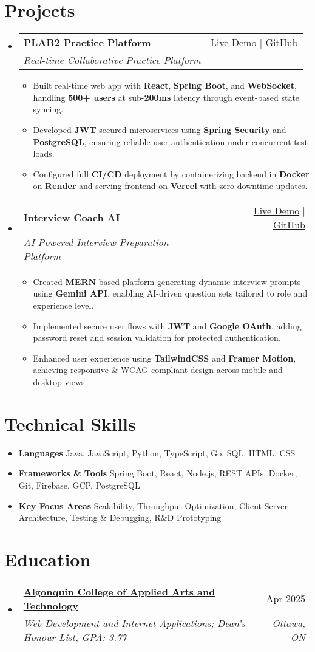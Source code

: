 \documentclass[letterpaper,11pt]{article}
\makeatletter
\newcommand{\resumeItem}[1]{\item\small{#1 \vspace{-2pt}}}
\newcommand{\resumeSubheading}[4]{
  \vspace{-1pt}\item
    \begin{tabular*}{0.97\textwidth}[t]{l@{\extracolsep{\fill}}r}
      \textbf{#1} & #2 \\
      \textit{\small#3} & \textit{\small #4} \\
    \end{tabular*}\vspace{-5pt}
}
\newcommand{\resumeSubHeadingListStart}{\begin{itemize}[leftmargin=*]}
\newcommand{\resumeSubHeadingListEnd}{\end{itemize}}
\newcommand{\resumeItemListStart}{\begin{itemize}}
\newcommand{\resumeItemListEnd}{\end{itemize}\vspace{-5pt}}
\makeatother
\begin{document}
\section{Projects}
  \resumeSubHeadingListStart
    \resumeSubheading
      {\textbf{PLAB2 Practice Platform}}{\href{https://plab2practice.com}{Live Demo} | \href{https://github.com/altansaid/plab2projectnew}{GitHub}}
      {Real-time Collaborative Practice Platform}{}
      \resumeItemListStart
        \resumeItem{Built real-time web app with \textbf{React}, \textbf{Spring Boot}, and \textbf{WebSocket}, handling \textbf{500+ users} at sub-\textbf{200ms} latency through event-based state syncing.}
        \resumeItem{Developed \textbf{JWT}-secured microservices using \textbf{Spring Security} and \textbf{PostgreSQL}, ensuring reliable user authentication under concurrent test loads.}
        \resumeItem{Configured full \textbf{CI/CD} deployment by containerizing backend in \textbf{Docker} on \textbf{Render} and serving frontend on \textbf{Vercel} with zero-downtime updates.}
      \resumeItemListEnd

    \resumeSubheading
      {\textbf{Interview Coach AI}}{\href{https://interviewcoach-ai.vercel.app/}{Live Demo} | \href{https://github.com/altansaid/interviewcoach-ai}{GitHub}}
      {AI-Powered Interview Preparation Platform}{}
      \resumeItemListStart
        \resumeItem{Created \textbf{MERN}-based platform generating dynamic interview prompts using \textbf{Gemini API}, enabling AI-driven question sets tailored to role and experience level.}
        \resumeItem{Implemented secure user flows with \textbf{JWT} and \textbf{Google OAuth}, adding password reset and session validation for protected authentication.}
        \resumeItem{Enhanced user experience using \textbf{TailwindCSS} and \textbf{Framer Motion}, achieving responsive \& WCAG-compliant design across mobile and desktop views.}
      \resumeItemListEnd
  \resumeSubHeadingListEnd

\section{Technical Skills}
  \resumeItemListStart
    \resumeItem{\textbf{Languages}}{Java, JavaScript, Python, TypeScript, Go, SQL, HTML, CSS}
    \resumeItem{\textbf{Frameworks \& Tools}}{Spring Boot, React, Node.js, REST APIs, Docker, Git, Firebase, GCP, PostgreSQL}
    \resumeItem{\textbf{Key Focus Areas}}{Scalability, Throughput Optimization, Client-Server Architecture, Testing \& Debugging, R\&D Prototyping}
  \resumeItemListEnd

\section{Education}
  \resumeSubHeadingListStart
    \resumeSubheading
      {\href{https://www.algonquincollege.com/sat/program/web-development-internet-applications/}{Algonquin College of Applied Arts and Technology}}{Apr 2025}
      {Web Development and Internet Applications; Dean's Honour List, GPA: 3.77}{Ottawa, ON}
  \resumeSubHeadingListEnd
\end{document}
